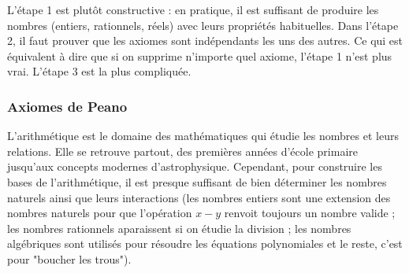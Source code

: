L'étape 1 est plutôt constructive : en pratique, il est suffisant de produire les nombres (entiers, rationnels, réels) avec leurs propriétés habituelles.
Dans l'étape 2, il faut prouver que les axiomes sont indépendants les uns des autres.
Ce qui est équivalent à dire que si on supprime n'importe quel axiome, l'étape 1 n'est plus vrai.
L'étape 3 est la plus compliquée.



%


\subsubsection*{Axiomes de Peano}
L'arithmétique est le domaine des mathématiques qui étudie les nombres et leurs relations.
Elle se retrouve partout, des premières années d'école primaire jusqu'aux concepts modernes d'astrophysique.
Cependant, pour construire les bases de l'arithmétique, il est presque suffisant de bien déterminer les nombres naturels ainsi que leurs interactions
(les nombres entiers sont une extension des nombres naturels pour que l'opération $x - y$ renvoit toujours un nombre valide ; les nombres rationnels aparaissent si on étudie la division ; les nombres algébriques sont utilisés pour résoudre les équations polynomiales et le reste, c'est pour "boucher les trous").


